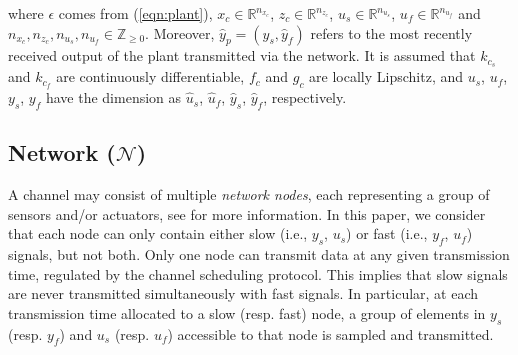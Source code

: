 where $\epsilon$ comes from (\ref{eqn:plant}), $x_c \in \mathbb{R}^{n_{x_c}}$, $z_c \in \mathbb{R}^{n_{z_c}}$, $u_s \in \mathbb{R}^{n_{u_s}}$, $u_f \in \mathbb{R}^{n_{u_f}}$ and $n_{x_c}, n_{z_c}, n_{u_s}, n_{u_f} \in \mathbb{Z}_{\geq 0}$. Moreover, $\hat y_p = (\hat y_s, \hat y_f)$ refers to the most recently received output of the plant transmitted via the network. It is assumed that $k_{c_s}$ and $k_{c_f}$ are continuously differentiable, $f_c$ and $g_c$ are locally Lipschitz, and $u_s$, $u_f$, $y_s$, $y_f$ have the dimension as $\hat u_s$, $\hat u_f$, $\hat y_s$, $\hat y_f$, respectively.
%
%



%
%





\subsection{Network ($\mathcal{N}$)}
A channel may consist of multiple \emph{network nodes}, each representing a group of sensors and/or actuators, see \cite{wang2017observer} for more information. In this paper, we consider that each node can only contain either slow (i.e., $y_s$, $u_s$) or fast (i.e., $y_f$, $u_f$) signals, but not both. Only one node can transmit data at any given transmission time, regulated by the channel scheduling protocol. This implies that slow signals are never transmitted simultaneously with fast signals. In particular, at each transmission time allocated to a slow (resp. fast) node, a group of elements in $y_s$ (resp. $y_f$) and $u_s$ (resp. $u_f$) accessible to that node is sampled and transmitted.


